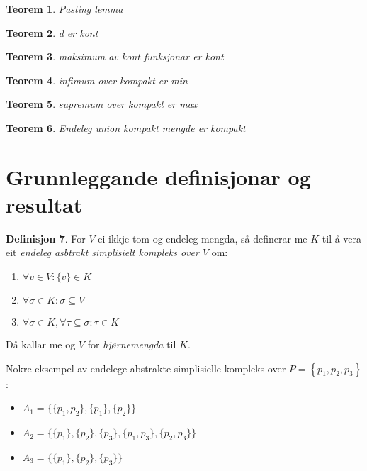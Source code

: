 \documentclass[a4paper, titlepage, 12pt, norsk]{article}
\theoremstyle{plain}
\newtheorem{theorem}{Teorem}[section]
\theoremstyle{definition}
\newtheorem{definition}[theorem]{Definisjon}
\newcommand{\set}[1]{ \left \{ #1 \right \} } %
\begin{document}
\begin{theorem}
	Pasting lemma
\end{theorem}

\begin{theorem} \label{thm:distanse-er-kont}
	d er kont
\end{theorem}

\begin{theorem} \label{thm:maksimum-av-kont-er-kont}
	maksimum av kont funksjonar er kont
\end{theorem}

\begin{theorem} \label{thm:infimum-over-kompakt-er-min}
	infimum over kompakt er min
\end{theorem}

\begin{theorem} \label{thm:supremum-over-kompakt-er-maks}
	supremum over kompakt er max
\end{theorem}


\begin{theorem} \label{thm:endeleg-union-kompakt-er-kompakt}
	Endeleg union kompakt mengde er kompakt
\end{theorem}

\section{Grunnleggande definisjonar og resultat}

\begin{definition} \label{def:ASK}
	For $V$ ei ikkje-tom og endeleg mengda, så definerar me $K$ til å vera eit \emph{endeleg asbtrakt simplisielt kompleks over $V$} om:
	\begin{enumerate}
		\item{$\forall v \in V: \{v\} \in K$}
		\item{\( \forall \sigma \in K: \sigma \subseteq V \)}
		\item{$\forall \sigma \in K, \forall \tau \subseteq \sigma: \tau \in K$}
	\end{enumerate}
	Då kallar me og $V$ for \emph{hjørnemengda} til $K$.
\end{definition}

Nokre eksempel av endelege abstrakte simplisielle kompleks over \( P=\set{p_1, p_2, p_3} \):

\begin{itemize}
	\item{$A_1=\{\{p_1, p_2\}, \{p_1\}, \{p_2\}\}$}
	\item{$A_2=\{\{p_1\}, \{p_2\}, \{p_3\}, \{p_1, p_3\}, \{p_2, p_3\}\}$}
	\item{$A_3=\{\{p_1\}, \{p_2\}, \{p_3\}\}$}
\end{itemize}
\end{document}
